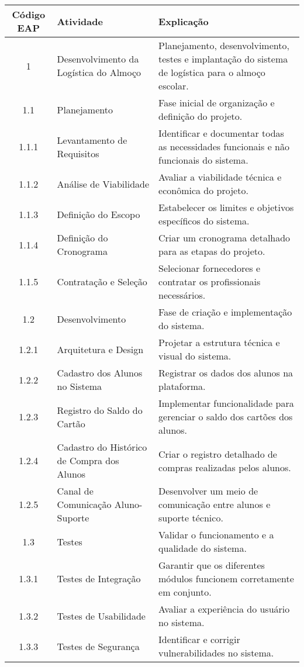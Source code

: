 \documentclass{article}
\begin{document}
\begin{longtable}{|c|l|p{10cm}|}
\hline
\textbf{Código EAP} & \textbf{Atividade} & \textbf{Explicação} \\ \hline
1 & Desenvolvimento da Logística do Almoço & Planejamento, desenvolvimento, testes e implantação do sistema de logística para o almoço escolar. \\ \hline
1.1 & Planejamento & Fase inicial de organização e definição do projeto. \\ \hline
1.1.1 & Levantamento de Requisitos & Identificar e documentar todas as necessidades funcionais e não funcionais do sistema. \\ \hline
1.1.2 & Análise de Viabilidade & Avaliar a viabilidade técnica e econômica do projeto. \\ \hline
1.1.3 & Definição do Escopo & Estabelecer os limites e objetivos específicos do sistema. \\ \hline
1.1.4 & Definição do Cronograma & Criar um cronograma detalhado para as etapas do projeto. \\ \hline
1.1.5 & Contratação e Seleção & Selecionar fornecedores e contratar os profissionais necessários. \\ \hline
1.2 & Desenvolvimento & Fase de criação e implementação do sistema. \\ \hline
1.2.1 & Arquitetura e Design & Projetar a estrutura técnica e visual do sistema. \\ \hline
1.2.2 & Cadastro dos Alunos no Sistema & Registrar os dados dos alunos na plataforma. \\ \hline
1.2.3 & Registro do Saldo do Cartão & Implementar funcionalidade para gerenciar o saldo dos cartões dos alunos. \\ \hline
1.2.4 & Cadastro do Histórico de Compra dos Alunos & Criar o registro detalhado de compras realizadas pelos alunos. \\ \hline
1.2.5 & Canal de Comunicação Aluno-Suporte & Desenvolver um meio de comunicação entre alunos e suporte técnico. \\ \hline
1.3 & Testes & Validar o funcionamento e a qualidade do sistema. \\ \hline
1.3.1 & Testes de Integração & Garantir que os diferentes módulos funcionem corretamente em conjunto. \\ \hline
1.3.2 & Testes de Usabilidade & Avaliar a experiência do usuário no sistema. \\ \hline
1.3.3 & Testes de Segurança & Identificar e corrigir vulnerabilidades no sistema. \\ \hline

\end{longtable}
\end{document}
